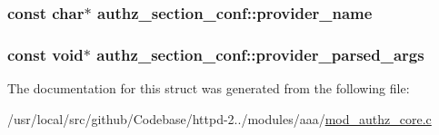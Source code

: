 \subsubsection[{\texorpdfstring{provider\+\_\+name}{provider_name}}]{\setlength{\rightskip}{0pt plus 5cm}const char$\ast$ authz\+\_\+section\+\_\+conf\+::provider\+\_\+name}\hypertarget{structauthz__section__conf_a42abdb1f95405c4d592854bc5f9d4a59}{}\label{structauthz__section__conf_a42abdb1f95405c4d592854bc5f9d4a59}
\subsubsection[{\texorpdfstring{provider\+\_\+parsed\+\_\+args}{provider_parsed_args}}]{\setlength{\rightskip}{0pt plus 5cm}const {\bf void}$\ast$ authz\+\_\+section\+\_\+conf\+::provider\+\_\+parsed\+\_\+args}\hypertarget{structauthz__section__conf_a7b6b3996c49bb4bface31f44107a17ec}{}\label{structauthz__section__conf_a7b6b3996c49bb4bface31f44107a17ec}


The documentation for this struct was generated from the following file\+:\begin{DoxyCompactItemize}
\item 
/usr/local/src/github/\+Codebase/httpd-\/2../modules/aaa/\hyperlink{mod__authz__core_8c}{mod\+\_\+authz\+\_\+core.\+c}\end{DoxyCompactItemize}

